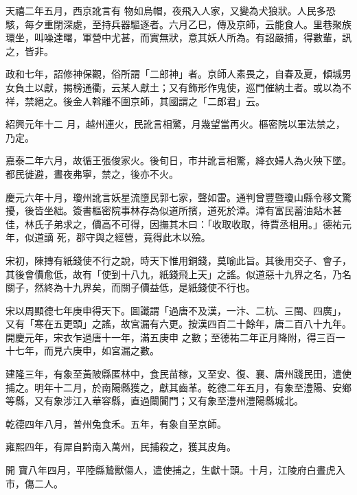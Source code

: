 \begin{pinyinscope}
 天禧二年五月，西京訛言有
 物如烏帽，夜飛入人家，又變為犬狼狀。人民多恐駭，每夕重閉深處，至持兵器驅逐者。六月乙巳，傳及京師，云能食人。里巷聚族環坐，叫噪達曙，軍營中尤甚，而實無狀，意其妖人所為。有詔嚴捕，得數輩，訊之，皆非。



 政和七年，詔修神保觀，俗所謂「二郎神」者。京師人素畏之，自春及夏，傾城男女負土以獻，揭榜通衢，云某人獻土；又有飾形作鬼使，巡門催納土者。或以為不祥，禁絕之。後金人斡離不圍京師，其國謂之「二郎君」云。



 紹興元年十二
 月，越州連火，民訛言相驚，月幾望當再火。樞密院以軍法禁之，乃定。



 嘉泰二年六月，故循王張俊家火。後旬日，市井訛言相驚，絳衣婦人為火殃下墜。都民徙避，晝夜弗寧，禁之，後亦不火。



 慶元六年十月，瓊州訛言妖星流墮民郭七家，聲如雷。通判曾豐暨瓊山縣令移文驚擾，後皆坐絀。簽書樞密院事林存為似道所擯，道死於漳。漳有富民蓄油煔木甚佳，林氏子弟求之，價高不可得，因撫其木曰：「收取收取，待賈丞相用。」德祐元年，似道謫
 死，郡守與之經營，竟得此木以殮。



 宋初，陳摶有紙錢使不行之說，時天下惟用銅錢，莫喻此旨。其後用交子、會子，其後會價愈低，故有「使到十八九，紙錢飛上天」之謠。似道惡十九界之名，乃名關子，然終為十九界矣，而關子價益低，是紙錢使不行也。



 宋以周顯德七年庚申得天下。圖讖謂「過唐不及漢，一汴、二杭、三閩、四廣」，又有「寒在五更頭」之謠，故宮漏有六更。按漢四百二十餘年，唐二百八十九年。開慶元年，宋衣乍過唐十一年，滿五庚申
 之數；至德祐二年正月降附，得三百一十七年，而見六庚申，如宮漏之數。



 建隆三年，有象至黃陂縣匿林中，食民苗稼，又至安、復、襄、唐州踐民田，遣使捕之。明年十二月，於南陽縣獲之，獻其齒革。乾德二年五月，有象至澧陽、安鄉等縣，又有象涉江入華容縣，直過闤闠門；又有象至澧州澧陽縣城北。



 乾德四年八月，普州兔食禾。五年，有象自至京師。



 雍熙四年，有犀自黔南入萬州，民捕殺之，獲其皮角。



 開
 寶八年四月，平陸縣鷙獸傷人，遣使捕之，生獻十頭。十月，江陵府白晝虎入市，傷二人。




\end{pinyinscope}
